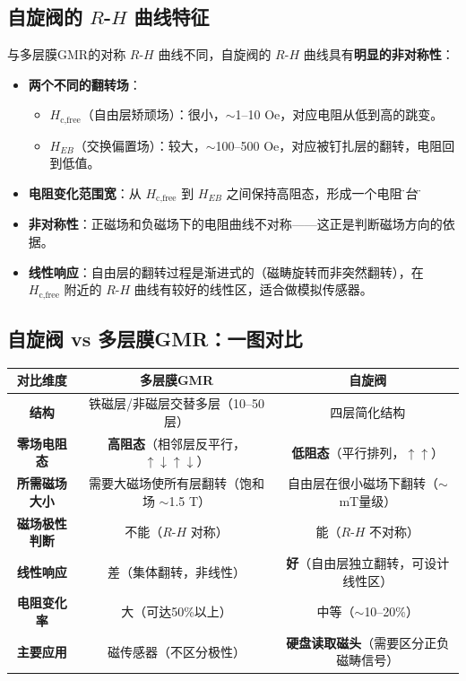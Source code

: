 \documentclass[12pt,a4paper]{article}
\newcommand{\hl}[1]{\textbf{\color{red}#1}}
\begin{document}
\subsection{自旋阀的 $R$-$H$ 曲线特征}

与多层膜GMR的对称 $R$-$H$ 曲线不同，自旋阀的 $R$-$H$ 曲线具有\textbf{明显的非对称性}：

\begin{itemize}
    \item \textbf{两个不同的翻转场}：
    \begin{itemize}
        \item $H_{\text{c,free}}$（自由层矫顽场）：很小，$\sim$1--10 Oe，对应电阻从低到高的跳变。
        \item $H_{EB}$（交换偏置场）：较大，$\sim$100--500 Oe，对应被钉扎层的翻转，电阻回到低值。
    \end{itemize}
    \item \textbf{电阻变化范围宽}：从 $H_{\text{c,free}}$ 到 $H_{EB}$ 之间保持高阻态，形成一个电阻\"平台\"。
    \item \textbf{非对称性}：正磁场和负磁场下的电阻曲线不对称——这正是判断磁场方向的依据。
    \item \textbf{线性响应}：自由层的翻转过程是渐进式的（磁畴旋转而非突然翻转），在 $H_{\text{c,free}}$ 附近的 $R$-$H$ 曲线有较好的线性区，适合做模拟传感器。
\end{itemize}

\subsection{自旋阀 vs 多层膜GMR：一图对比}

\begin{tabular}{|c|c|c|}
    \hline
    \textbf{对比维度} & \textbf{多层膜GMR} & \textbf{自旋阀} \\
    \hline
    \textbf{结构} & 铁磁层/非磁层交替多层（10--50层） & 四层简化结构 \\
    \hline
    \textbf{零场电阻态} & \hl{高阻态}（相邻层反平行，$\uparrow\downarrow\uparrow\downarrow$） & \hl{低阻态}（平行排列，$\uparrow\uparrow$） \\
    \hline
    \textbf{所需磁场大小} & 需要大磁场使所有层翻转（饱和场 $\sim$1.5 T） & 自由层在很小磁场下翻转（$\sim$mT量级） \\
    \hline
    \textbf{磁场极性判断} & 不能（$R$-$H$ 对称） & 能（$R$-$H$ 不对称） \\
    \hline
    \textbf{线性响应} & 差（集体翻转，非线性） & \hl{好}（自由层独立翻转，可设计线性区） \\
    \hline
    \textbf{电阻变化率} & 大（可达50\%以上） & 中等（$\sim$10--20\%） \\
    \hline
    \textbf{主要应用} & 磁传感器（不区分极性） & \hl{硬盘读取磁头}（需要区分正负磁畴信号） \\
    \hline
\end{tabular}
\end{document}
